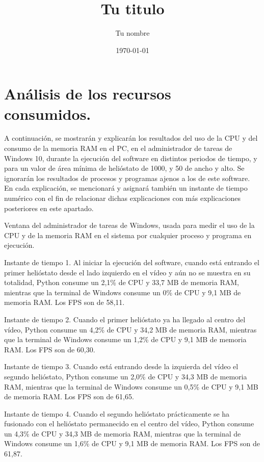 \documentclass[12pt]{article}
\title{Tu titulo}					%
\author{Tu nombre}					%
\date{\today}						%
\begin{document}
\tableofcontents
\pagebreak


\section{Análisis de los recursos consumidos.}

A continuación, se mostrarán y explicarán los resultados del uso de la CPU y del consumo de la memoria RAM en el PC, en el administrador de tareas de Windows 10, durante la ejecución del software en distintos periodos de tiempo, y para un valor de área mínima de helióstato de 1000, y 50 de ancho y alto. Se ignorarán los resultados de procesos y programas ajenos a los de este software. En cada explicación, se mencionará y asignará también un instante de tiempo numérico con el fin de relacionar dichas explicaciones con más explicaciones posteriores en este apartado.



Ventana del administrador de tareas de Windows, usada para medir el uso de la CPU y de la memoria RAM en el sistema por cualquier proceso y programa en ejecución.




Instante de tiempo 1. Al iniciar la ejecución del software, cuando está entrando el primer helióstato desde el lado izquierdo en el vídeo y aún no se muestra en su totalidad, Python consume un 2,1\% de CPU y 33,7 MB de memoria RAM, mientras que la terminal de Windows consume un 0\% de CPU y 9,1 MB de memoria RAM. Los FPS son de 58,11.




Instante de tiempo 2. Cuando el primer helióstato ya ha llegado al centro del vídeo, Python consume un 4,2\% de CPU y 34,2 MB de memoria RAM, mientras que la terminal de Windows consume un 1,2\% de CPU y 9,1 MB de memoria RAM. Los FPS son de 60,30.




Instante de tiempo 3. Cuando está entrando desde la izquierda del vídeo el segundo helióstato, Python consume un 2,0\% de CPU y 34,3 MB de memoria RAM, mientras que la terminal de Windows consume un 0,5\% de CPU y 9,1 MB de memoria RAM. Los FPS son de 61,65.




Instante de tiempo 4. Cuando el segundo helióstato prácticamente se ha fusionado con el helióstato permanecido en el centro del vídeo, Python consume un 4,3\% de CPU y 34,3 MB de memoria RAM, mientras que la terminal de Windows consume un 1,6\% de CPU y 9,1 MB de memoria RAM. Los FPS son de 61,87.
\end{document}
